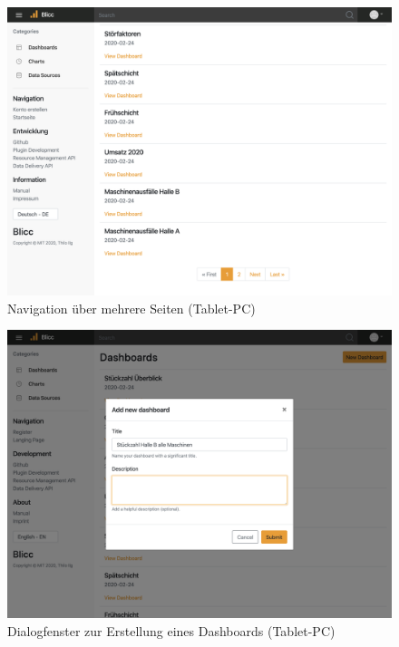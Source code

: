 \begin{figure}[h]
    \centering
    \includegraphics[scale=0.35]{img/tablet/Pagination}
    \caption{Navigation über mehrere Seiten (Tablet-PC)}
    \label{figure:navigationuebermehrereseiten}
\end{figure}

\begin{figure}[h]
    \centering
    \includegraphics[scale=0.35]{img/tablet/Modal}
    \caption{Dialogfenster zur Erstellung eines Dashboards (Tablet-PC)}
    \label{figure:dialogfensterzurerstellungeinesdashboards}
\end{figure}
